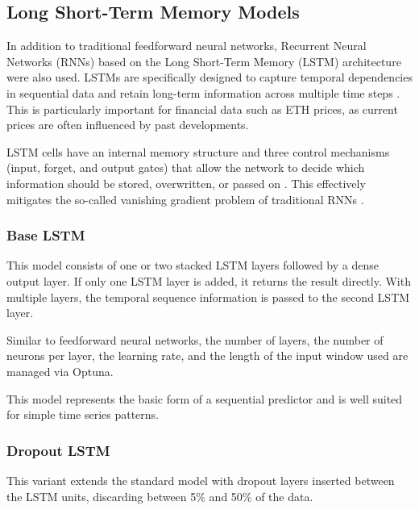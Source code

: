 

\subsection{Long Short-Term Memory Models}
\label{chap:lstm}

In addition to traditional feedforward neural networks, Recurrent Neural Networks (RNNs) based on the Long Short-Term Memory (LSTM) architecture were also used.
LSTMs are specifically designed to capture temporal dependencies in sequential data and retain long-term information across multiple time steps \cite{lstm-usage}.
This is particularly important for financial data such as ETH prices, as current prices are often influenced by past developments.

LSTM cells have an internal memory structure and three control mechanisms (input, forget, and output gates) that allow the network to decide which information should be stored, overwritten, or passed on \cite{lstm-cell}.
This effectively mitigates the so-called vanishing gradient problem of traditional RNNs \cite{lstm-gradient-problem}.

\subsubsection{Base LSTM}

This model consists of one or two stacked LSTM layers followed by a dense output layer.
If only one LSTM layer is added, it returns the result directly.
With multiple layers, the temporal sequence information is passed to the second LSTM layer.

Similar to feedforward neural networks, the number of layers, the number of neurons per layer, the learning rate, and the length of the input window used are managed via Optuna.

This model represents the basic form of a sequential predictor and is well suited for simple time series patterns.



\subsubsection{Dropout LSTM}

This variant extends the standard model with dropout layers inserted between the LSTM units, discarding between 5\% and 50\% of the data.

